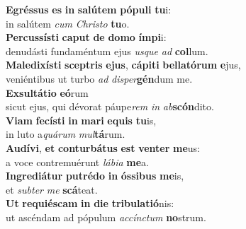 \oddverse \textbf{E}\textbf{grés}\textbf{sus} \textbf{es} \textbf{in} \textbf{sa}\textbf{lú}\textbf{tem} \textbf{pó}\textbf{pu}\textbf{li} \textbf{tu}i:~\*\\
\oddverse in salútem \textit{cum} \textit{Chri}\textit{sto} \textbf{tu}o.\\
\evenverse \textbf{Per}\textbf{cus}\textbf{sí}\textbf{sti} \textbf{ca}\textbf{put} \textbf{de} \textbf{do}\textbf{mo} \textbf{ím}\textbf{pi}i:~\*\\
\evenverse denudásti fundaméntum ejus \textit{us}\textit{que} \textit{ad} \textbf{col}lum.\\
\oddverse \textbf{Ma}\textbf{le}\textbf{di}\textbf{xí}\textbf{sti} \textbf{scep}\textbf{tris} \textbf{e}\textbf{jus}, \textbf{cá}\textbf{pi}\textbf{ti} \textbf{bel}\textbf{la}\textbf{tó}\textbf{rum} \textbf{e}jus,~\*\\
\oddverse veniéntibus ut turbo \textit{ad} \textit{di}\textit{sper}\textbf{gén}dum me.\\
\evenverse \textbf{Ex}\textbf{sul}\textbf{tá}\textbf{ti}\textbf{o} \textbf{e}\textbf{ó}rum~\*\\
\evenverse sicut ejus, qui dévorat páupe\textit{rem} \textit{in} \textit{ab}\textbf{scón}dito.\\
\oddverse \textbf{Vi}\textbf{am} \textbf{fe}\textbf{cí}\textbf{sti} \textbf{in} \textbf{ma}\textbf{ri} \textbf{e}\textbf{quis} \textbf{tu}is,~\*\\
\oddverse in luto a\textit{quá}\textit{rum} \textit{mul}\textbf{tá}rum.\\
\evenverse \textbf{Au}\textbf{dí}\textbf{vi}, \textbf{et} \textbf{con}\textbf{tur}\textbf{bá}\textbf{tus} \textbf{est} \textbf{ven}\textbf{ter} \textbf{me}us:~\*\\
\evenverse a voce contremuérunt \textit{lá}\textit{bi}\textit{a} \textbf{me}a.\\
\oddverse \textbf{In}\textbf{gre}\textbf{di}\textbf{á}\textbf{tur} \textbf{pu}\textbf{tré}\textbf{do} \textbf{in} \textbf{ós}\textbf{si}\textbf{bus} \textbf{me}is,~\*\\
\oddverse et \textit{sub}\textit{ter} \textit{me} \textbf{scá}teat.\\
\evenverse \textbf{Ut} \textbf{re}\textbf{qui}\textbf{é}\textbf{scam} \textbf{in} \textbf{di}\textbf{e} \textbf{tri}\textbf{bu}\textbf{la}\textbf{ti}\textbf{ó}nis:~\*\\
\evenverse ut ascéndam ad pópulum \textit{ac}\textit{cín}\textit{ctum} \textbf{no}strum.\\
